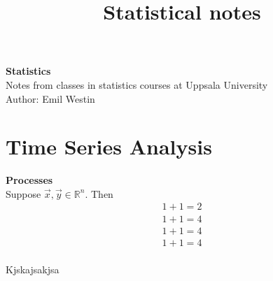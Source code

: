 \documentclass[11pt]{article}
\begin{document}
\title{Statistical notes}

\thispagestyle{empty}

\begin{center}
{\LARGE \bf Statistics}\\
Notes from classes in statistics courses at Uppsala University \\
Author: Emil Westin
\end{center}

\section{Time Series Analysis}

\textbf{Processes}\\

Suppose $\vec{x},\vec{y} \in \mathbb{R}^n$. Then 
\begin{align}
1+1 = 2 \label{MA1} \\
1+1 = 4 \label{MA2} \\
1+1 = 4 \label{AR1} \\
1+1 = 4 \label{AR1} \\
\end{align}

Kjskajsakjsa
\end{document}
